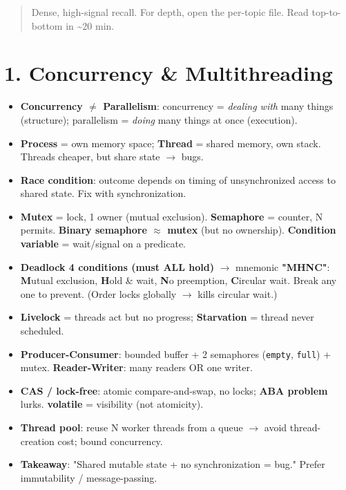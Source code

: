 \documentclass[11pt]{article}
\providecommand{\tightlist}{\setlength{\itemsep}{1pt}\setlength{\parskip}{0pt}}
\begin{document}
\makecoverpage

\thispagestyle{empty}
{\hypersetup{hidelinks}\tableofcontents}
\clearpage

\begin{quote}
Dense, high-signal recall. For depth, open the per-topic file. Read top-to-bottom in \textasciitilde20 min.
\end{quote}

\section{1. Concurrency \& Multithreading}\label{1-concurrency--multithreading}

\begin{itemize}
\tightlist
\item
  \textbf{Concurrency \(\neq\) Parallelism}: concurrency = \emph{dealing with} many things (structure); parallelism = \emph{doing} many things at once (execution).
\item
  \textbf{Process} = own memory space; \textbf{Thread} = shared memory, own stack. Threads cheaper, but share state \(\rightarrow\) bugs.
\item
  \textbf{Race condition}: outcome depends on timing of unsynchronized access to shared state. Fix with synchronization.
\item
  \textbf{Mutex} = lock, 1 owner (mutual exclusion). \textbf{Semaphore} = counter, N permits. \textbf{Binary semaphore \(\approx\) mutex} (but no ownership). \textbf{Condition variable} = wait/signal on a predicate.
\item
  \textbf{Deadlock 4 conditions (must ALL hold)} \(\rightarrow\) mnemonic \textbf{"MHNC"}: \textbf{M}utual exclusion, \textbf{H}old \& wait, \textbf{N}o preemption, \textbf{C}ircular wait. Break any one to prevent. (Order locks globally \(\rightarrow\) kills circular wait.)
\item
  \textbf{Livelock} = threads act but no progress; \textbf{Starvation} = thread never scheduled.
\item
  \textbf{Producer-Consumer}: bounded buffer + 2 semaphores (\texttt{empty}, \texttt{full}) + mutex. \textbf{Reader-Writer}: many readers OR one writer.
\item
  \textbf{CAS / lock-free}: atomic compare-and-swap, no locks; \textbf{ABA problem} lurks. \textbf{volatile} = visibility (not atomicity).
\item
  \textbf{Thread pool}: reuse N worker threads from a queue \(\rightarrow\) avoid thread-creation cost; bound concurrency.
\item
  \textbf{Takeaway}: "Shared mutable state + no synchronization = bug." Prefer immutability / message-passing.
\end{itemize}
\end{document}
